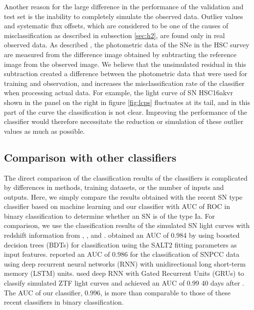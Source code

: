 \documentclass[proof]{pasj01}
\providecommand{\DIFadd}[1]{{\protect\color{blue} \sf #1}} %
\providecommand{\DIFdel}[1]{{\protect\color{red} \scriptsize #1}} %
\providecommand{\DIFaddbegin}{\protect\color{blue}} %
\providecommand{\DIFaddend}{\protect\color{black}} %
\providecommand{\DIFdelbegin}{\protect\color{red}} %
\providecommand{\DIFdelend}{\protect\color{black}} %
\newcommand{\DIFscaledelfig}{0.5}
\newlength{\DIFdelgraphicswidth} %
\newlength{\DIFdelgraphicsheight} %
\newcommand{\DIFaddincludegraphics}[2][]{{\color{blue}\fbox{\DIFOincludegraphics[#1]{#2}}}} %
\newcommand{\DIFdelincludegraphics}[2][]{%
\sbox{\DIFdelgraphicsbox}{\DIFOincludegraphics[#1]{#2}}%
\settoboxwidth{\DIFdelgraphicswidth}{\DIFdelgraphicsbox} %
\settoboxtotalheight{\DIFdelgraphicsheight}{\DIFdelgraphicsbox} %
\scalebox{\DIFscaledelfig}{%
\parbox[b]{\DIFdelgraphicswidth}{\usebox{\DIFdelgraphicsbox}\\[-\baselineskip] \rule{\DIFdelgraphicswidth}{0em}}\llap{\resizebox{\DIFdelgraphicswidth}{\DIFdelgraphicsheight}{%
\setlength{\unitlength}{\DIFdelgraphicswidth}%
\begin{picture}(1,1)%
\thicklines\linethickness{2pt} %
{\color[rgb]{1,0,0}\put(0,0){\framebox(1,1){}}}%
{\color[rgb]{1,0,0}\put(0,0){\line( 1,1){1}}}%
{\color[rgb]{1,0,0}\put(0,1){\line(1,-1){1}}}%
\end{picture}%
}\hspace*{3pt}}} %
} %
\DeclareRobustCommand{\DIFaddbegin}{\DIFOaddbegin \let\includegraphics\DIFaddincludegraphics} %
\DeclareRobustCommand{\DIFaddend}{\DIFOaddend \let\includegraphics\DIFOincludegraphics} %
\DeclareRobustCommand{\DIFdelbegin}{\DIFOdelbegin \let\includegraphics\DIFdelincludegraphics} %
\DeclareRobustCommand{\DIFdelend}{\DIFOaddend \let\includegraphics\DIFOincludegraphics} %
\begin{document}
Another reason for the large difference in the performance of the validation and test set is the inability to completely simulate the observed data.
Outlier values and systematic flux offsets, which are considered to be one of the causes of misclassification as described in subsection \ref{sec:h2}, are found only in real observed data.
As described \DIFdelbegin \DIFdel{in }\DIFdelend \DIFaddbegin \DIFadd{previously }\DIFaddend \citet{yasuda19a}, the photometric data of the SNe in the HSC survey are measured from the difference image obtained by subtracting the reference image from the observed image.
We believe that the unsimulated residual in this subtraction created a difference between the photometric data that were used for training and observation, and increases the misclassification rate of the classifier when processing actual data.
For example, the light curve of SN HSC16akvr shown in the panel on the right in figure \ref{fig:lcps} fluctuates at its tail, and in this part of the curve the classification is not clear.
Improving the performance of the classifier would therefore necessitate the reduction or simulation of these outlier values as much as possible.
%
%
%
\subsection{Comparison with other classifiers}
\label{sec:comparison}
%
The direct comparison of the classification results of the classifiers is complicated by differences in methods, training datasets, or the number of inputs and outputs. 
Here, we simply compare the results obtained with the recent SN type classifier based on machine learning and our classifier with AUC of ROC in binary classification to determine whether an SN is of the type Ia.
For comparison, we use the classification results of the simulated SN light curves with redshift information from \citet{Lochner_2016}, \citet{charnock17a}, and \citet{Muthukrishna_2019}.
\citet{Lochner_2016} obtained an AUC of 0.984 by using boosted decision trees (BDTs) for classification using the SALT2 fitting parameters as input features.
\citet{charnock17a} reported an AUC of 0.986 for the classification of SNPCC data using deep recurrent neural networks (RNN) with unidirectional long short-term memory (LSTM) units.
\citet{Muthukrishna_2019} used deep RNN with Gated Recurrent Units (GRUs) to classify simulated ZTF light curves and achieved an AUC of 0.99 40 days after \DIFdelbegin \DIFdel{the trigger}\DIFdelend \DIFaddbegin \DIFadd{an event was triggered}\DIFaddend .
The AUC of our classifier, 0.996, is more than comparable to those of these recent classifiers in binary classification.
\end{document}
